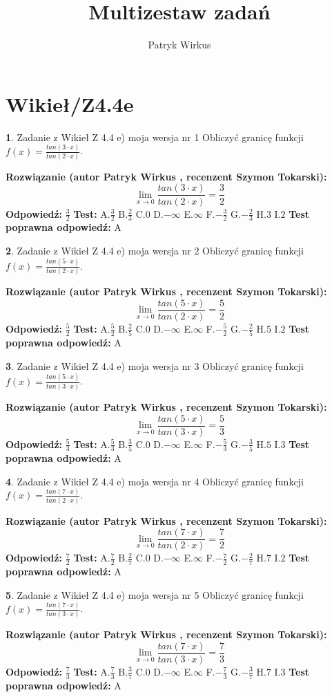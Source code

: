 \documentclass[12pt, a4paper]{article}
\title{Multizestaw zadań}
\author{Patryk Wirkus}
\date{}
\theoremstyle{definition} %
\newtheorem{zad}{}
\newcommand{\kategoria}[1]{\section{#1}}
\newcommand{\zadStart}[1]{\begin{zad}#1\newline}
\newcommand{\zadStop}{\end{zad}}
\newcommand{\rozwStart}[2]{\noindent \textbf{Rozwiązanie (autor #1 , recenzent #2): }\newline}
\newcommand{\rozwStop}{\newline}
\newcommand{\odpStart}{\noindent \textbf{Odpowiedź:}\newline}
\newcommand{\odpStop}{\newline}
\newcommand{\testStart}{\noindent \textbf{Test:}\newline}
\newcommand{\testStop}{\newline}
\newcommand{\kluczStart}{\noindent \textbf{Test poprawna odpowiedź:}\newline}
\newcommand{\kluczStop}{\newline}
\begin{document}
\maketitle

\kategoria{Wikieł/Z4.4e}


\zadStart{Zadanie z Wikieł Z 4.4 e) moja wersja nr 1}
Obliczyć granicę funkcji $f(x)=\frac{tan(3\cdot x)}{tan(2\cdot x)}$.
\zadStop
\rozwStart{Patryk Wirkus}{Szymon Tokarski}
$$\lim\limits_{x\to 0}\frac{tan(3\cdot x)}{tan(2\cdot x)}=
\frac{3}{2}$$
\rozwStop
\odpStart
$\frac{3}{2}$
\odpStop
\testStart
A.$\frac{3}{2}$
B.$\frac{2}{3}$
C.$0$
D.$-\infty$
E.$\infty$
F.$-\frac{3}{2}$
G.$-\frac{2}{3}$
H.$3$
I.$2$
\testStop
\kluczStart
A
\kluczStop



\zadStart{Zadanie z Wikieł Z 4.4 e) moja wersja nr 2}
Obliczyć granicę funkcji $f(x)=\frac{tan(5\cdot x)}{tan(2\cdot x)}$.
\zadStop
\rozwStart{Patryk Wirkus}{Szymon Tokarski}
$$\lim\limits_{x\to 0}\frac{tan(5\cdot x)}{tan(2\cdot x)}=
\frac{5}{2}$$
\rozwStop
\odpStart
$\frac{5}{2}$
\odpStop
\testStart
A.$\frac{5}{2}$
B.$\frac{2}{5}$
C.$0$
D.$-\infty$
E.$\infty$
F.$-\frac{5}{2}$
G.$-\frac{2}{5}$
H.$5$
I.$2$
\testStop
\kluczStart
A
\kluczStop



\zadStart{Zadanie z Wikieł Z 4.4 e) moja wersja nr 3}
Obliczyć granicę funkcji $f(x)=\frac{tan(5\cdot x)}{tan(3\cdot x)}$.
\zadStop
\rozwStart{Patryk Wirkus}{Szymon Tokarski}
$$\lim\limits_{x\to 0}\frac{tan(5\cdot x)}{tan(3\cdot x)}=
\frac{5}{3}$$
\rozwStop
\odpStart
$\frac{5}{3}$
\odpStop
\testStart
A.$\frac{5}{3}$
B.$\frac{3}{5}$
C.$0$
D.$-\infty$
E.$\infty$
F.$-\frac{5}{3}$
G.$-\frac{3}{5}$
H.$5$
I.$3$
\testStop
\kluczStart
A
\kluczStop



\zadStart{Zadanie z Wikieł Z 4.4 e) moja wersja nr 4}
Obliczyć granicę funkcji $f(x)=\frac{tan(7\cdot x)}{tan(2\cdot x)}$.
\zadStop
\rozwStart{Patryk Wirkus}{Szymon Tokarski}
$$\lim\limits_{x\to 0}\frac{tan(7\cdot x)}{tan(2\cdot x)}=
\frac{7}{2}$$
\rozwStop
\odpStart
$\frac{7}{2}$
\odpStop
\testStart
A.$\frac{7}{2}$
B.$\frac{2}{7}$
C.$0$
D.$-\infty$
E.$\infty$
F.$-\frac{7}{2}$
G.$-\frac{2}{7}$
H.$7$
I.$2$
\testStop
\kluczStart
A
\kluczStop



\zadStart{Zadanie z Wikieł Z 4.4 e) moja wersja nr 5}
Obliczyć granicę funkcji $f(x)=\frac{tan(7\cdot x)}{tan(3\cdot x)}$.
\zadStop
\rozwStart{Patryk Wirkus}{Szymon Tokarski}
$$\lim\limits_{x\to 0}\frac{tan(7\cdot x)}{tan(3\cdot x)}=
\frac{7}{3}$$
\rozwStop
\odpStart
$\frac{7}{3}$
\odpStop
\testStart
A.$\frac{7}{3}$
B.$\frac{3}{7}$
C.$0$
D.$-\infty$
E.$\infty$
F.$-\frac{7}{3}$
G.$-\frac{3}{7}$
H.$7$
I.$3$
\testStop
\kluczStart
A
\kluczStop
\end{document}
